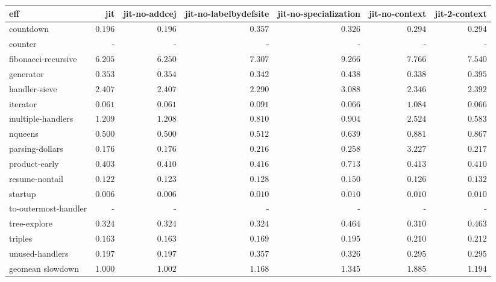 \begin{tabular}{l r r r r r r}
\toprule eff & jit & jit-no-addcej & jit-no-labelbydefsite & jit-no-specialization & jit-no-context & jit-2-context \\
\midrule
countdown & $0.196$ & $\mathbf{0.196}$ & $0.357$ & $0.326$ & $0.294$ & $0.294$ \\
counter & - & - & - & - & - & - \\
fibonacci-recursive & $\mathbf{6.205}$ & $6.250$ & $7.307$ & $9.266$ & $7.766$ & $7.540$ \\
generator & $0.353$ & $0.354$ & $0.342$ & $0.438$ & $\mathbf{0.338}$ & $0.395$ \\
handler-sieve & $2.407$ & $2.407$ & $\mathbf{2.290}$ & $3.088$ & $2.346$ & $2.392$ \\
iterator & $0.061$ & $\mathbf{0.061}$ & $0.091$ & $0.066$ & $1.084$ & $0.066$ \\
multiple-handlers & $1.209$ & $1.208$ & $0.810$ & $0.904$ & $2.524$ & $\mathbf{0.583}$ \\
nqueens & $0.500$ & $\mathbf{0.500}$ & $0.512$ & $0.639$ & $0.881$ & $0.867$ \\
parsing-dollars & $0.176$ & $\mathbf{0.176}$ & $0.216$ & $0.258$ & $3.227$ & $0.217$ \\
product-early & $\mathbf{0.403}$ & $0.410$ & $0.416$ & $0.713$ & $0.413$ & $0.410$ \\
resume-nontail & $\mathbf{0.122}$ & $0.123$ & $0.128$ & $0.150$ & $0.126$ & $0.132$ \\
startup & $\mathbf{0.006}$ & $0.006$ & $0.010$ & $0.010$ & $0.010$ & $0.010$ \\
to-outermost-handler & - & - & - & - & - & - \\
tree-explore & $0.324$ & $0.324$ & $0.324$ & $0.464$ & $\mathbf{0.310}$ & $0.463$ \\
triples & $0.163$ & $\mathbf{0.163}$ & $0.169$ & $0.195$ & $0.210$ & $0.212$ \\
unused-handlers & $\mathbf{0.197}$ & $0.197$ & $0.357$ & $0.326$ & $0.295$ & $0.295$ \\
\midrule
 geomean slowdown & $1.000$ & $1.002$ & $1.168$ & $1.345$ & $1.885$ & $1.194$ \\
\bottomrule
\end{tabular}